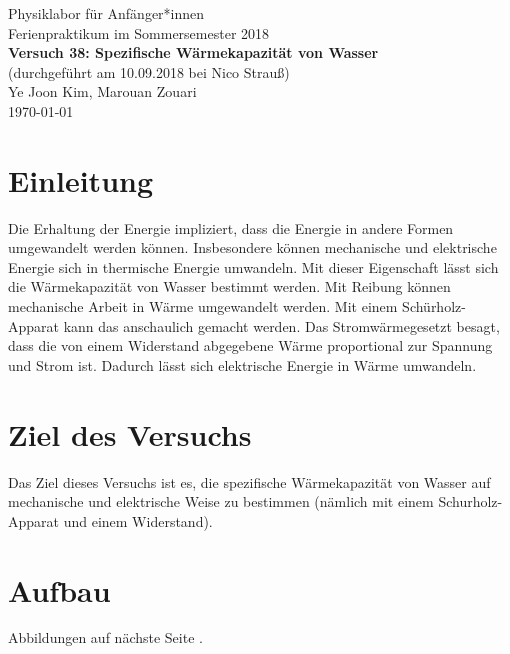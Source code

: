 \documentclass[11pt,a4paper]{article} %
\begin{document}
	
	
	{
		\centering 
		\large 
		Physiklabor für Anfänger*innen \\
		Ferienpraktikum im Sommersemester 2018 \\[4mm]
		\textbf{\LARGE 
			Versuch 38: Spezifische Wärmekapazität von Wasser
		} \\[3mm]
		(durchgeführt am 10.09.2018 bei Nico Strauß) \\
		Ye Joon Kim, Marouan Zouari\\
		\today \\[10mm]
	}
\section{Einleitung}
Die Erhaltung der Energie impliziert, dass die Energie in andere Formen umgewandelt werden können. Insbesondere können mechanische und elektrische Energie sich in thermische Energie umwandeln. Mit dieser Eigenschaft lässt sich die Wärmekapazität von Wasser bestimmt werden. Mit Reibung können mechanische Arbeit in Wärme umgewandelt werden. Mit einem Schürholz-Apparat kann das anschaulich gemacht werden. Das Stromwärmegesetzt besagt, dass die von einem Widerstand abgegebene Wärme proportional zur Spannung und Strom ist. Dadurch lässt sich elektrische Energie in Wärme umwandeln. 

\section{Ziel des Versuchs}
Das Ziel dieses Versuchs ist es, die spezifische Wärmekapazität von Wasser auf mechanische und elektrische Weise zu bestimmen (nämlich mit einem Schurholz-Apparat und einem Widerstand).  
\section{Aufbau}
Abbildungen auf n\"{a}chste Seite .
\end{document}
